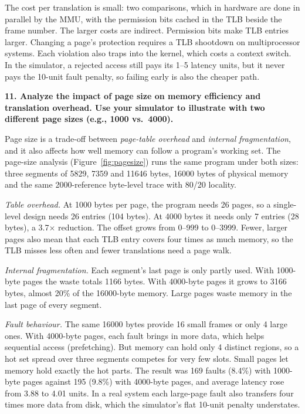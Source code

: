 \documentclass[11pt]{article}
\newcommand{\question}[1]{\par\medskip\noindent\textbf{#1}\par\smallskip}
\begin{document}
The cost per translation is small: two comparisons, which in hardware are done in parallel
by the MMU, with the permission bits cached in the TLB beside the frame number. The larger costs are
indirect. Permission bits make TLB entries larger. Changing a page's protection requires a TLB
shootdown on multiprocessor systems. Each violation also traps into the kernel, which costs a context
switch. In the simulator, a rejected access still pays its 1--5 latency units, but it never pays the
10-unit fault penalty, so failing early is also the cheaper path.

\question{11. Analyze the impact of page size on memory efficiency and translation overhead. Use your simulator to illustrate with two different page sizes (e.g., 1000 vs.\ 4000).}
Page size is a trade-off between \emph{page-table overhead} and \emph{internal fragmentation}, and
it also affects how well memory can follow a program's working set. The page-size analysis
(Figure~\ref{fig:pagesize}) runs the same program under both sizes: three segments of 5829, 7359
and 11646 bytes, 16000 bytes of physical memory and the same 2000-reference byte-level trace with
80/20 locality.

\emph{Table overhead.} At 1000 bytes per page, the program needs 26 pages, so a single-level design needs
26 entries (104 bytes). At 4000 bytes it needs only 7 entries (28 bytes), a 3.7$\times$ reduction. The offset
grows from 0--999 to 0--3999. Fewer, larger pages also mean that each TLB entry covers four times as much
memory, so the TLB misses less often and fewer translations need a page walk.

\emph{Internal fragmentation.} Each segment's last page is only partly used. With 1000-byte pages
the waste totals 1166 bytes. With 4000-byte pages it grows to 3166 bytes, almost 20\% of the
16000-byte memory. Large pages waste memory in the last page of every segment.

\emph{Fault behaviour.} The same 16000 bytes provide 16 small frames or only 4 large ones. With
4000-byte pages, each fault brings in more data, which helps sequential access (prefetching). But
memory can hold only 4 distinct regions, so a hot set spread over three segments competes for very
few slots. Small pages let memory hold exactly the hot parts. The result was 169 faults (8.4\%) with
1000-byte pages against 195 (9.8\%) with 4000-byte pages, and average latency rose from 3.88 to 4.01
units. In a real system each large-page fault also transfers four times more data from disk,
which the simulator's flat 10-unit penalty understates.
\end{document}
